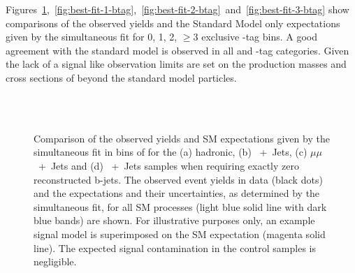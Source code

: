 Figures~\ref{fig:best-fit-0-btag},~\ref{fig:best-fit-1-btag},~\ref{fig:best-fit-2-btag}~and~\ref{fig:best-fit-3-btag} show comparisons of the observed yields 
and the Standard Model only expectations given by the simultaneous fit for 0, 
1, 2, $\ge3$ exclusive \Pbottom-tag bins. A good agreement with the standard 
model is observed in all \HT and \Pbottom-tag categories. Given the lack of a 
signal like observation limits are set on the production masses and cross 
sections of beyond the standard model particles. 

\begin{figure}[h!]
  \begin{center}
     \\
     \\
    \caption{\label{fig:best-fit-0-btag} Comparison of the observed
      yields and SM expectations given by the simultaneous fit in bins
      of \HT for the (a) hadronic, (b) \Pmu~+~Jets, (c)
      $\mu\mu$~+~Jets and (d) \Pphoton~+~Jets
      samples when requiring exactly zero reconstructed
      b-jets. The observed event yields in data (black dots) and the
      expectations and their uncertainties, as determined by the
      simultaneous fit, for all SM processes (light blue solid line
      with dark blue bands) are shown. For illustrative purposes only,
      an example signal model is superimposed on the SM expectation
      (magenta solid line). The expected signal contamination in the
      control samples is negligible.} 
  \end{center}
\end{figure}

